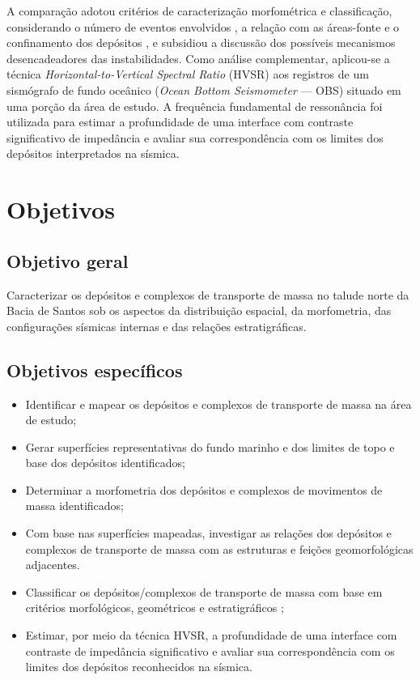 A comparação adotou critérios de caracterização morfométrica \cite{clare2018} e classificação, considerando o número de eventos envolvidos \cite{clare2018}, a relação com as áreas-fonte \cite{moscardelli2008} e o confinamento dos depósitos \cite{frey2006,gamboa2016}, e subsidiou a discussão dos possíveis mecanismos desencadeadores das instabilidades. Como análise complementar, aplicou-se a técnica \textit{Horizontal-to-Vertical Spectral Ratio} (HVSR) \cite{nakamura1989} aos registros de um sismógrafo de fundo oceânico (\textit{Ocean Bottom Seismometer} — OBS) situado em uma porção da área de estudo. A frequência fundamental de ressonância foi utilizada para estimar a profundidade de uma interface com contraste significativo de impedância e avaliar sua correspondência com os limites dos depósitos interpretados na sísmica.

\section{Objetivos}\label{sec:1-1}

\subsection{Objetivo geral}\label{sec:1-1-1}

Caracterizar os depósitos e complexos de transporte de massa no talude norte da Bacia de Santos sob os aspectos da distribuição espacial, da morfometria, das configurações sísmicas internas e das relações estratigráficas.

\subsection{Objetivos específicos}\label{sec:1-1-2}

\begin{itemize}
  \item Identificar e mapear os depósitos e complexos de transporte de massa na área de estudo;
  \item Gerar superfícies representativas do fundo marinho e dos limites de topo e base dos depósitos identificados;
  \item Determinar a morfometria dos depósitos e complexos de movimentos de massa identificados;
  \item Com base nas superfícies mapeadas, investigar as relações dos depósitos e complexos de transporte de massa com as estruturas e feições geomorfológicas adjacentes.
  \item Classificar os depósitos/complexos de transporte de massa com base em critérios morfológicos, geométricos e estratigráficos ;
  \item Estimar, por meio da técnica HVSR, a profundidade de uma interface com contraste de impedância significativo e avaliar sua correspondência com os limites dos depósitos reconhecidos na sísmica.
\end{itemize}

